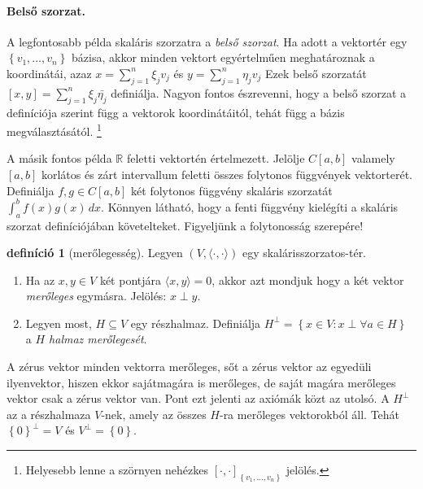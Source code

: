 \documentclass[9pt, a4paper, showtrims]{memoir}
\theoremstyle{plain}
\theoremstyle{remark}
\theoremstyle{definition}
\newtheorem{definition}[proposition]{definíció}
\newcommand{\ip}[2]{\langle#1,#2\rangle}
\begin{document}
\paragraph{Belső szorzat.} A legfontosabb példa skaláris szorzatra a \emph{belső szorzat}.
Ha adott a vektortér egy $\left\{ v_1,\dots,v_n \right\}$ bázisa,
akkor minden vektort egyértelműen meghatároznak a koordinátái,
azaz 
\begin{math}
    x=\sum_{j=1}^n\xi_jv_j
\end{math}
és
\begin{math}
    y=\sum_{j=1}^n\eta_jv_j
\end{math}
Ezek belső szorzatát 
\begin{math}
    \left[ x,y \right]=\sum_{j=1}^n\xi_j\bar{\eta_j}
\end{math}
definiálja.
Nagyon fontos észrevenni, 
hogy a belső szorzat a definíciója szerint függ a vektorok koordinátáitól, 
tehát függ a bázis megválasztásától.%
\footnote{
    Helyesebb lenne a szörnyen nehézkes 
    $\left[ \cdot,\cdot \right]_{\left\{ v_1,\dots,v_n \right\}}$ jelölés.
}

A másik fontos példa $\mathbb{R}$ feletti vektortén értelmezett.
Jelölje $C\left[ a,b \right]$ valamely $\left[ a,b \right]$ korlátos és zárt intervallum feletti összes folytonos függvények vektorterét.
Definiálja $f,g\in C\left[ a,b \right]$ két folytonos függvény skaláris szorzatát
\begin{math}
    \int_{a}^{b}f\left( x \right)g\left( x \right)\,dx.
\end{math}
Könnyen látható, hogy a fenti függvény kielégíti a skaláris szorzat definíciójában követelteket.
Figyeljünk a folytonosság szerepére!

\begin{definition}[merőlegesség]
    Legyen $\left( V,\ip{\cdot}{\cdot} \right)$ egy skalárisszorzatos-tér.
    \begin{enumerate}
        \item 
            Ha az $x,y\in V$ két pontjára $\ip{x}{y}=0$, 
            akkor azt mondjuk hogy a két vektor \emph{merőleges} egymásra. 
            Jelölés: $x\perp y$.
        \item
            Legyen most, $H\subseteq V$ egy részhalmaz.
            Definiálja
            \(
                H^{\perp}=\left\{ x\in V:x\perp \forall a\in H \right\}
            \)
            a \emph{$H$ halmaz merőlegesét}.\qedhere
    \end{enumerate}
\end{definition}
A zérus vektor minden vektorra merőleges, sőt a zérus vektor az egyedüli ilyenvektor, hiszen ekkor sajátmagára is merőleges,
de saját magára merőleges vektor csak a zérus vektor van. 
Pont ezt jelenti az axiómák közt az utolsó.
A $H^\perp$ az a részhalmaza $V$-nek, amely az összes $H$-ra merőleges vektorokból áll.
Tehát $\left\{ 0 \right\}^\perp = V$ és $V^{\perp}=\left\{ 0 \right\}$.
\end{document}
